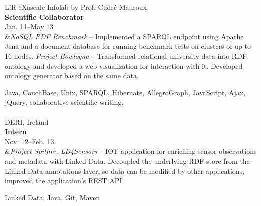 \documentclass[11pt]{article}
\newcommand\VRule{\color{lightgray}\vrule width 0.5pt}
\begin{document}
\begin{tabular}{L!{\VRule}R}
eXascale Infolab by Prof. Cudr\'e-Mauroux\\
{\bf Scientific Collaborator}\\
Jan. 11--May 13\\&{\it NoSQL RDF Benchmark} -- Implemented a SPARQL endpoint
using Apache Jena and a document database for running benchmark tests on clusters of
up to 16 nodes. \cite{nosqlrdf}
{\it Project Bowlogna} -- Transformed relational
university data into RDF ontology and developed a web visualization for
interaction with it. Developed ontology generator based on the same data. \cite{
bowlognaBench, bowlFost}

Java, CouchBase, Unix,
SPARQL, Hibernate, AllegroGraph, JavaScript, Ajax, jQuery,
collaborative scientific writing.\\
\\
DERI, Ireland\\
{\bf Intern}\\
Nov. 12--Feb. 13\\
&{\it Project Spitfire, LD4Sensors} -- IOT application for enriching sensor
observations and metadata with Linked Data. Decoupled the underlying RDF store
from the Linked Data annotations layer, so data can be modified by other
applications, improved the application's REST API.

Linked Data, Java, Git, Maven\\
\\




\end{tabular}
\end{document}
